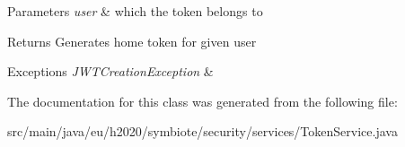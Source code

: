 \begin{DoxyParams}{Parameters}
{\em user} & which the token belongs to \\
\hline
\end{DoxyParams}
\begin{DoxyReturn}{Returns}
Generates home token for given user 
\end{DoxyReturn}

\begin{DoxyExceptions}{Exceptions}
{\em J\+W\+T\+Creation\+Exception} & \\
\hline
\end{DoxyExceptions}


The documentation for this class was generated from the following file\+:\begin{DoxyCompactItemize}
\item 
src/main/java/eu/h2020/symbiote/security/services/Token\+Service.\+java\end{DoxyCompactItemize}
